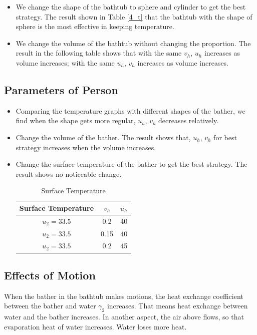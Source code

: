 \documentclass[12pt,a4paper,titlepage]{article}
\begin{document}
\begin{itemize}

\item We change the shape of the bathtub to sphere and cylinder to get the best strategy. The result shown in Table \ref{4_t} that the bathtub with the shape of sphere is the most effective in keeping temperature.


     \item We change the volume of the bathtub without changing the proportion. The result in the following table shows that with the same $v_h$, $u_h$ increases as volume increases; with the same $u_h$, $v_h$ increases as volume increases.
\end{itemize}

\subsection{Parameters of Person}
\label{sec:parameters of person}
\begin{itemize}
\item Comparing the temperature graphs with different shapes of the bather, we find when the shape gets more regular, $u_h$, $v_h$ decreases relatively.
\item Change the volume of the bather. The result shows that, $u_h$, $v_h$ for best strategy increases when the volume increases.
\item Change the surface temperature of the bather to get the best strategy. The result shows no noticeable change.
\begin{table}
\begin{center}
\begin{tabular}{c|c|c}
\hline
 Surface Temperature     &$v_h$  &$u_h$        \\ \hline
 $u_2=33.5$    &0.2             & 40              \\ \hline
 $u_2=33.5$    &0.15            & 40              \\ \hline
 $u_2=33.5$  &0.2             & 45              \\ \hline
\end{tabular}
\end{center}
\caption{Surface Temperature}\label{5_t}
\end{table}
\end{itemize}

\subsection{Effects of Motion}
\label{sec:effects of motion}
When the bather in the bathtub makes motions, the heat exchange coefficient between the bather and water ${\gamma}_2$ increases. That means heat exchange between water and the bather increases. In another aspect, the air above flows, so that evaporation heat of water increases. Water loses more heat.
\end{document}
